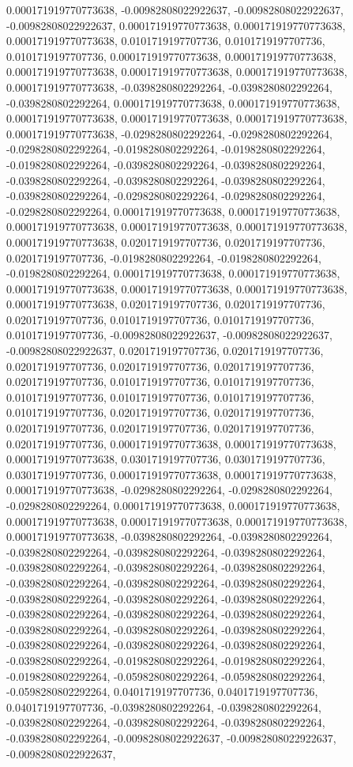 \documentclass[
  ,man]{apa6}
\begin{document}
0.000171919770773638, -0.00982808022922637, -0.00982808022922637, -0.00982808022922637, 0.000171919770773638, 0.000171919770773638, 0.000171919770773638, 0.0101719197707736, 0.0101719197707736, 0.0101719197707736, 0.000171919770773638, 0.000171919770773638, 0.000171919770773638, 0.000171919770773638, 0.000171919770773638, 0.000171919770773638, -0.0398280802292264, -0.0398280802292264, -0.0398280802292264, 0.000171919770773638, 0.000171919770773638, 0.000171919770773638, 0.000171919770773638, 0.000171919770773638,
0.000171919770773638, -0.0298280802292264, -0.0298280802292264, -0.0298280802292264, -0.0198280802292264, -0.0198280802292264, -0.0198280802292264, -0.0398280802292264, -0.0398280802292264, -0.0398280802292264, -0.0398280802292264, -0.0398280802292264, -0.0398280802292264, -0.0298280802292264, -0.0298280802292264, -0.0298280802292264, 0.000171919770773638, 0.000171919770773638, 0.000171919770773638, 0.000171919770773638, 0.000171919770773638, 0.000171919770773638, 0.0201719197707736, 0.0201719197707736,
0.0201719197707736, -0.0198280802292264, -0.0198280802292264, -0.0198280802292264, 0.000171919770773638, 0.000171919770773638, 0.000171919770773638, 0.000171919770773638, 0.000171919770773638, 0.000171919770773638, 0.0201719197707736, 0.0201719197707736, 0.0201719197707736, 0.0101719197707736, 0.0101719197707736, 0.0101719197707736, -0.00982808022922637, -0.00982808022922637, -0.00982808022922637, 0.0201719197707736, 0.0201719197707736, 0.0201719197707736, 0.0201719197707736, 0.0201719197707736,
0.0201719197707736, 0.0101719197707736, 0.0101719197707736, 0.0101719197707736, 0.0101719197707736, 0.0101719197707736, 0.0101719197707736, 0.0201719197707736, 0.0201719197707736, 0.0201719197707736, 0.0201719197707736, 0.0201719197707736, 0.0201719197707736, 0.000171919770773638, 0.000171919770773638, 0.000171919770773638, 0.0301719197707736, 0.0301719197707736, 0.0301719197707736, 0.000171919770773638, 0.000171919770773638, 0.000171919770773638, -0.0298280802292264, -0.0298280802292264, -0.0298280802292264,
0.000171919770773638, 0.000171919770773638, 0.000171919770773638, 0.000171919770773638, 0.000171919770773638, 0.000171919770773638, -0.0398280802292264, -0.0398280802292264, -0.0398280802292264, -0.0398280802292264, -0.0398280802292264, -0.0398280802292264, -0.0398280802292264, -0.0398280802292264, -0.0398280802292264, -0.0398280802292264, -0.0398280802292264, -0.0398280802292264, -0.0398280802292264, -0.0398280802292264, -0.0398280802292264, -0.0398280802292264, -0.0398280802292264, -0.0398280802292264,
-0.0398280802292264, -0.0398280802292264, -0.0398280802292264, -0.0398280802292264, -0.0398280802292264, -0.0398280802292264, -0.0198280802292264, -0.0198280802292264, -0.0198280802292264, -0.0598280802292264, -0.0598280802292264, -0.0598280802292264, 0.0401719197707736, 0.0401719197707736, 0.0401719197707736, -0.0398280802292264, -0.0398280802292264, -0.0398280802292264, -0.0398280802292264, -0.0398280802292264, -0.0398280802292264, -0.00982808022922637, -0.00982808022922637, -0.00982808022922637,
\end{document}
